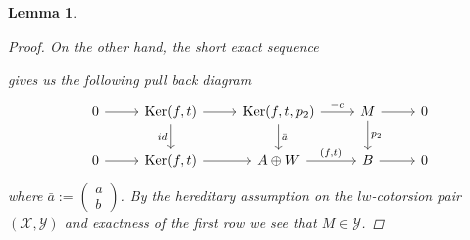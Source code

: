 \documentclass[12pt]{amsart}
\numberwithin{equation}{section}
\newtheorem{lemma}{Lemma}[section]
\theoremstyle{definition}
\DeclareMathOperator{\Ker}{Ker}
\newtheorem*{theorem 0*}{Theorem}
\newtheorem*{theorem a*}{Theorem A}
\newtheorem*{theorem b*}{Theorem B}
\newcounter{diagram}
\numberwithin{diagram}{section}
\begin{document}
\begin{lemma}
\begin{proof}
On the other hand, the short exact sequence
\begin{center} 
 \end{center}
gives us the following pull back diagram
\[\begin{tikzcd}
	0 & {\Ker(f,t)} & {\Ker(f,t,p_2)} & M & 0 \\
	0 & {\Ker(f,t)} & {A\oplus W} & B & 0
	\arrow[from=1-1, to=1-2]
	\arrow[from=1-2, to=1-3]
	\arrow["id"', from=1-2, to=2-2]
	\arrow["-c", from=1-3, to=1-4]
	\arrow["\bar{a}", from=1-3, to=2-3]
	\arrow[from=1-4, to=1-5]
	\arrow["p_2", from=1-4, to=2-4]
	\arrow[from=2-1, to=2-2]
	\arrow[from=2-2, to=2-3]
	\arrow["{(f,t)}", from=2-3, to=2-4]
	\arrow[from=2-4, to=2-5]
\end{tikzcd}\]
where $\bar{a}:=\begin{pmatrix}
    a\\b
\end{pmatrix}$. By the hereditary assumption on the $lw$-cotorsion pair $(\mathcal{X},\mathcal{Y})$ and exactness of the first row we see that $M\in\mathcal{Y}$.
\end{proof}
\end{lemma}
\end{document}
